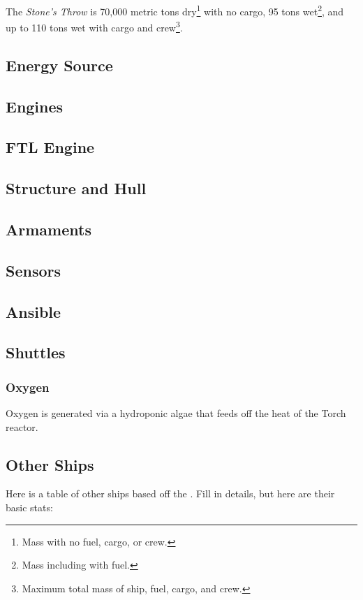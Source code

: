 \par
The \textit{Stone's Throw} is 70,000 metric tons dry\footnote{Mass with no fuel, cargo, or crew.} with no cargo, 95 tons wet\footnote{Mass including with fuel.}, and up to 110 tons wet with cargo and crew\footnote{Maximum total mass of ship, fuel, cargo, and crew.}.

\subsection{Energy Source}

\subsection{Engines}

\subsection{FTL Engine}

\subsection{Structure and Hull}

\subsection{Armaments}

\subsection{Sensors}

\subsection{Ansible}

\subsection{Shuttles}

\subsubsection{Oxygen}
Oxygen is generated via a hydroponic algae that feeds off the heat of the Torch reactor.

\subsection{Other Ships}
Here is a table of other ships based off the \shipname . Fill in details, but here are their basic stats:


